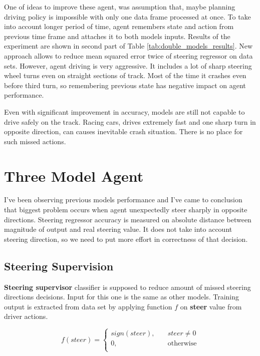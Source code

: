 \documentclass[declaration,shortabstract,english,inz]{iithesis}
\begin{document}
One of ideas to improve these agent, was assumption that, maybe planning driving policy is impossible with only one data frame processed at once.
To take into account longer period of time, agent remembers state and action from previous time frame and attaches it to both models inputs.
Results of the experiment are shown in second part of Table \ref{tab:double_models_results}.
New approach allows to reduce mean squared error twice of steering regressor on data sets.
However, agent driving is very aggressive.
It includes a lot of sharp steering wheel turns even on straight sections of track.
Most of the time it crashes even before third turn, so remembering previous state has negative impact on agent performance.

Even with significant improvement in accuracy, models are still not capable to drive safely on the track.
Racing cars, drives extremely fast and one sharp turn in opposite direction, can causes inevitable crash situation.
There is no place for such missed actions.
 

\section{Three Model Agent}

I've been observing previous models performance and I've came to conclusion that biggest problem occurs when agent unexpectedly steer sharply in opposite directions.
Steering regressor accuracy is measured on absolute distance between magnitude of output and real steering value.
It does not take into account steering direction, so we need to put more effort in correctness of that decision.

\subsection{Steering Supervision}


\textbf{Steering supervisor} classifier is supposed to reduce amount of missed steering directions decisions.
Input for this one is the same as other models.
Training output is extracted from data set by applying function $f$ on \textbf{steer} value from driver actions.

$$ f(steer) =  \begin{cases}
    sign(steer), &\quad steer\neq0 \\
    0, &\quad \text{otherwise} \\
  \end{cases}
 $$
\end{document}
